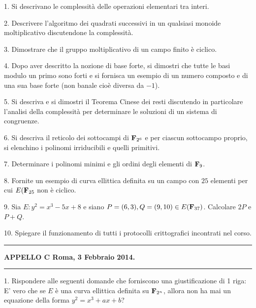 \item{1.} Si descrivano le complessit\`a delle operazioni elementari tra interi.
\item{2.} Descrivere l'algoritmo dei quadrati successivi in un qualsiasi monoide moltiplicativo discutendone
la complessit\`a.
\item{3.} Dimostrare che il gruppo moltiplicativo di un campo finito \`e ciclico. 
\item{4.} Dopo aver descritto la nozione di base forte, si dimostri che tutte le basi modulo un primo sono forti e si fornisca
un esempio di un numero composto e di una sua base forte (non banale cio\`e diversa da $-1$).  
\item{5.} Si descriva e si dimostri il Teorema Cinese dei resti discutendo in particolare l'analisi della complessit\`a
per determinare le soluzioni di un sistema di congruenze.
\item{6.} Si descriva il reticolo dei sottocampi di ${\bf F}_{2^6}$ e per ciascun sottocampo proprio, si elenchino i polinomi
irriducibili e quelli primitivi.
\item{7.} Determinare i polinomi minimi e gli ordini degli elementi di ${\bf F}_{9}$.
\item{8.} Fornite un esempio di curva ellittica definita su un campo con $25$ elementi per cui $E({\bf F}_{25}$ non \`e
ciclico.
\item{9.} Sia $E : y^2 = x^3 − 5x + 8$ e siano $P = (6, 3),Q = (9, 10) \in E({\bf F}_{37})$. Calcolare $2P$ e $P+Q$.
\item{10.} Spiegare il funzionamento di tutti i protocolli crittografici incontrati nel corso.
\bigskip

\bigskip\hrule\bigskip
\centerline{{\bf APPELLO C \hfill Roma, 3 Febbraio 2014.}}\bigskip\hrule\bigskip

\item{1.} Rispondere alle seguenti domande che forniscono una giustificazione di 1 riga:
 E' vero che se $E$ \`e una curva ellittica definita su ${\bf F}_{2^n}$, allora
non ha mai un equazione della forma $y^2=x^3+ax+b$?

